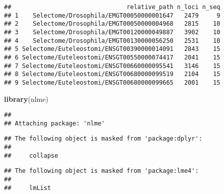 \documentclass[
]{article}
\newenvironment{Shaded}{\begin{snugshade}}{\end{snugshade}}
\newcommand{\KeywordTok}[1]{\textcolor[rgb]{0.13,0.29,0.53}{\textbf{#1}}}
\newcommand{\NormalTok}[1]{#1}
\newcommand{\OperatorTok}[1]{\textcolor[rgb]{0.81,0.36,0.00}{\textbf{#1}}}
\newcommand{\StringTok}[1]{\textcolor[rgb]{0.31,0.60,0.02}{#1}}
\begin{document}
\begin{Shaded}
\end{Shaded}

\begin{verbatim}
##                                relative_path n_loci n_seq
## 1    Selectome/Drosophila/EMGT00050000001647   2479     9
## 2    Selectome/Drosophila/EMGT00050000004968   2815    10
## 3    Selectome/Drosophila/EMGT00120000049887   3902    10
## 4    Selectome/Drosophila/EMGT00130000056250   2531    10
## 5 Selectome/Euteleostomi/ENSGT00390000014091   2843    15
## 6 Selectome/Euteleostomi/ENSGT00550000074417   2041    15
## 7 Selectome/Euteleostomi/ENSGT00660000095541   3146    15
## 8 Selectome/Euteleostomi/ENSGT00680000099519   2104    15
## 9 Selectome/Euteleostomi/ENSGT00680000099665   2001    15
\end{verbatim}

\begin{Shaded}
\begin{Highlighting}[]
\KeywordTok{library}\NormalTok{(nlme)}
\end{Highlighting}
\end{Shaded}

\begin{verbatim}
## 
## Attaching package: 'nlme'
\end{verbatim}

\begin{verbatim}
## The following object is masked from 'package:dplyr':
## 
##     collapse
\end{verbatim}

\begin{verbatim}
## The following object is masked from 'package:lme4':
## 
##     lmList
\end{verbatim}
\end{document}
